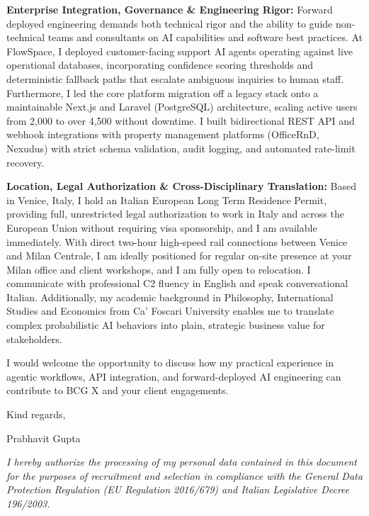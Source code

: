 \documentclass[10.5pt,a4paper]{article}
\begin{document}
\textbf{Enterprise Integration, Governance \& Engineering Rigor:} Forward deployed engineering demands both technical rigor and the ability to guide non-technical teams and consultants on AI capabilities and software best practices. At FlowSpace, I deployed customer-facing support AI agents operating against live operational databases, incorporating confidence scoring thresholds and deterministic fallback paths that escalate ambiguous inquiries to human staff. Furthermore, I led the core platform migration off a legacy stack onto a maintainable Next.js and Laravel (PostgreSQL) architecture, scaling active users from 2,000 to over 4,500 without downtime. I built bidirectional REST API and webhook integrations with property management platforms (OfficeRnD, Nexudus) with strict schema validation, audit logging, and automated rate-limit recovery.

\textbf{Location, Legal Authorization \& Cross-Disciplinary Translation:} Based in Venice, Italy, I hold an Italian European Long Term Residence Permit, providing full, unrestricted legal authorization to work in Italy and across the European Union without requiring visa sponsorship, and I am available immediately. With direct two-hour high-speed rail connections between Venice and Milan Centrale, I am ideally positioned for regular on-site presence at your Milan office and client workshops, and I am fully open to relocation. I communicate with professional C2 fluency in English and speak conversational Italian. Additionally, my academic background in Philosophy, International Studies and Economics from Ca' Foscari University enables me to translate complex probabilistic AI behaviors into plain, strategic business value for stakeholders.

I would welcome the opportunity to discuss how my practical experience in agentic workflows, API integration, and forward-deployed AI engineering can contribute to BCG X and your client engagements.

Kind regards,

Prabhavit Gupta

\vspace{0.4em}
{\footnotesize \textit{I hereby authorize the processing of my personal data contained in this document for the purposes of recruitment and selection in compliance with the General Data Protection Regulation (EU Regulation 2016/679) and Italian Legislative Decree 196/2003.}\par}
\end{document}
